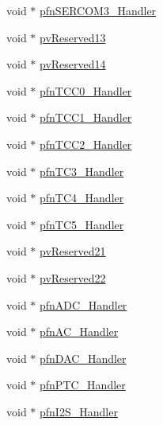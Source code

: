 \begin{DoxyCompactItemize}
\item 
void $\ast$ \mbox{\hyperlink{struct___device_vectors_a26f86889d037ec199f2c93e352831906}{pfn\+S\+E\+R\+C\+O\+M3\+\_\+\+Handler}}
\item 
void $\ast$ \mbox{\hyperlink{struct___device_vectors_a081ba49f0da38010c3bd0d3701a0b468}{pv\+Reserved13}}
\item 
void $\ast$ \mbox{\hyperlink{struct___device_vectors_ad2a3b53ed48ee85fa0a34edaab2b837f}{pv\+Reserved14}}
\item 
void $\ast$ \mbox{\hyperlink{struct___device_vectors_ace3b7fbc9873f57eb1602b66ef4c03d4}{pfn\+T\+C\+C0\+\_\+\+Handler}}
\item 
void $\ast$ \mbox{\hyperlink{struct___device_vectors_a655cc6f39cdb54ec22f3fa89bdd76968}{pfn\+T\+C\+C1\+\_\+\+Handler}}
\item 
void $\ast$ \mbox{\hyperlink{struct___device_vectors_aa80e9bcb854e3c3d8945d1f2aa7b0158}{pfn\+T\+C\+C2\+\_\+\+Handler}}
\item 
void $\ast$ \mbox{\hyperlink{struct___device_vectors_a77eb10fdd976e913732c24d9dde6e956}{pfn\+T\+C3\+\_\+\+Handler}}
\item 
void $\ast$ \mbox{\hyperlink{struct___device_vectors_a66044c1519b1bc792a09cda2ac5fc622}{pfn\+T\+C4\+\_\+\+Handler}}
\item 
void $\ast$ \mbox{\hyperlink{struct___device_vectors_a381876f4d9872a247bc126a93bcdb7c6}{pfn\+T\+C5\+\_\+\+Handler}}
\item 
void $\ast$ \mbox{\hyperlink{struct___device_vectors_a80cf76d55200aa2a76fce940a83c7e83}{pv\+Reserved21}}
\item 
void $\ast$ \mbox{\hyperlink{struct___device_vectors_acfbc32411fd4287520a667d806959fe6}{pv\+Reserved22}}
\item 
void $\ast$ \mbox{\hyperlink{struct___device_vectors_aabbbc74ef73e086e27ca015eb5e7d02d}{pfn\+A\+D\+C\+\_\+\+Handler}}
\item 
void $\ast$ \mbox{\hyperlink{struct___device_vectors_a4638ac0dc2efd342a1afd452139fbbf1}{pfn\+A\+C\+\_\+\+Handler}}
\item 
void $\ast$ \mbox{\hyperlink{struct___device_vectors_afd1719d9593cd6afd47ea5eb25737ba1}{pfn\+D\+A\+C\+\_\+\+Handler}}
\item 
void $\ast$ \mbox{\hyperlink{struct___device_vectors_a61a8bc24eec233ff031ce97814839787}{pfn\+P\+T\+C\+\_\+\+Handler}}
\item 
void $\ast$ \mbox{\hyperlink{struct___device_vectors_a498a87db0f27b37241d1bcf651ddcdd0}{pfn\+I2\+S\+\_\+\+Handler}}
\item 

\end{DoxyCompactItemize}
